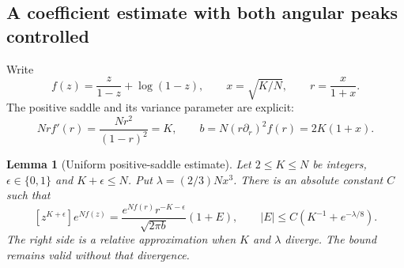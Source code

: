 \documentclass[11pt]{article}
\newtheorem{lemma}[theorem]{Lemma}
\theoremstyle{definition}
\theoremstyle{remark}
\newcommand{\1}{\mathbf 1}
\begin{document}
\subsection{A coefficient estimate with both angular peaks controlled}

Write
\[
f(z)=\frac{z}{1-z}+\log(1-z),\qquad
x=\sqrt{K/N},\qquad r=\frac{x}{1+x}.
\]
The positive saddle and its variance parameter are explicit:
\begin{equation}\label{eq:saddleequation}
Nrf'(r)=\frac{Nr^2}{(1-r)^2}=K,\qquad
b=N(r\partial_r)^2f(r)=2K(1+x).
\end{equation}

\begin{lemma}[Uniform positive-saddle estimate]\label{lem:saddle}
Let $2\le K\le N$ be integers, $\epsilon\in\{0,1\}$ and $K+\epsilon\le N$. Put $\lambda=(2/3)Nx^3$. There is an absolute constant $C$ such that
\begin{equation}\label{eq:saddlecoefficient}
[z^{K+\epsilon}]e^{Nf(z)}
=\frac{e^{Nf(r)}r^{-K-\epsilon}}{\sqrt{2\pi b}}(1+E),
\qquad |E|\le C\left(K^{-1}+e^{-\lambda/8}\right).
\end{equation}
The right side is a relative approximation when $K$ and $\lambda$ diverge. The bound remains valid without that divergence.
\end{lemma}
\end{document}
